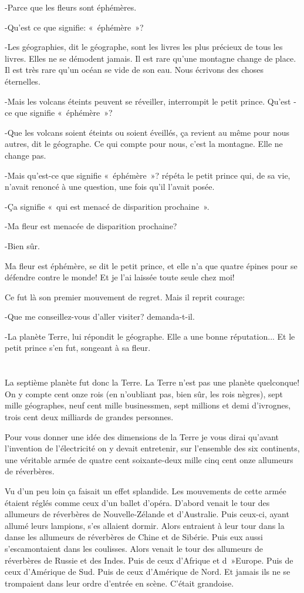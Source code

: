\documentclass{report}
\newcommand{\parachapter}[2][]{\chapter[#1]{#2}}
\begin{document}
-Parce que les fleurs sont éphémères.

-Qu'est ce que signifie: «~éphémère~»?

-Les géographies, dit le géographe, sont les livres les plus précieux de tous les livres. Elles ne se démodent jamais. Il est rare qu'une montagne change de place. Il est très rare qu'un océan se vide de son eau. Nous écrivons des choses éternelles.

-Mais les volcans éteints peuvent se réveiller, interrompit le petit prince. Qu'est -ce que signifie «~éphémère~»?

-Que les volcans soient éteints ou soient éveillés, ça revient au même pour nous autres, dit le géographe. Ce qui compte pour nous, c'est la montagne. Elle ne change pas.

-Mais qu'est-ce que signifie «~éphémère~»? répéta le petit prince qui, de sa vie, n'avait renoncé à une question, une fois qu'il l'avait posée.

-Ça signifie «~qui est menacé de disparition prochaine~».

-Ma fleur est menacée de disparition prochaine?

-Bien sûr.

Ma fleur est éphémère, se dit le petit prince, et elle n'a que quatre épines pour se défendre contre le monde! Et je l'ai laissée toute seule chez moi!

Ce fut là son premier mouvement de regret. Mais il reprit courage:

-Que me conseillez-vous d'aller visiter? demanda-t-il.

-La planète Terre, lui répondit le géographe. Elle a une bonne réputation...
Et le petit prince s'en fut, songeant à sa fleur.
\parachapter{} %
La septième planète fut donc la Terre.
La Terre n'est pas une planète quelconque! On y compte cent onze rois (en n'oubliant pas, bien sûr, les rois nègres), sept mille géographes, neuf cent mille businessmen, sept millions et demi d'ivrognes, trois cent deux milliards de grandes personnes.

Pour vous donner une idée des dimensions de la Terre je vous dirai qu'avant l'invention de l'électricité on y devait entretenir, sur l'ensemble des six continents, une véritable armée de quatre cent soixante-deux mille cinq cent onze allumeurs de réverbères.

Vu d'un peu loin ça faisait un effet splandide. Les mouvements de cette armée étaient réglés comme ceux d'un ballet d'opéra. D'abord venait le tour des allumeurs de réverbères de Nouvelle-Zélande et d'Australie. Puis ceux-ci, ayant allumé leurs lampions, s'es allaient dormir. Alors entraient à leur tour dans la danse les allumeurs de réverbères de Chine et de Sibérie. Puis eux aussi s'escamontaient dans les coulisses. Alors venait le tour des allumeurs de réverbères de Russie et des Indes. Puis de ceux d'Afrique et d~»Europe. Puis de ceux d'Amérique de Sud. Puis de ceux d'Amérique de Nord. Et jamais ils ne se trompaient dans leur ordre d'entrée en scène. C'était grandoise.
\end{document}
